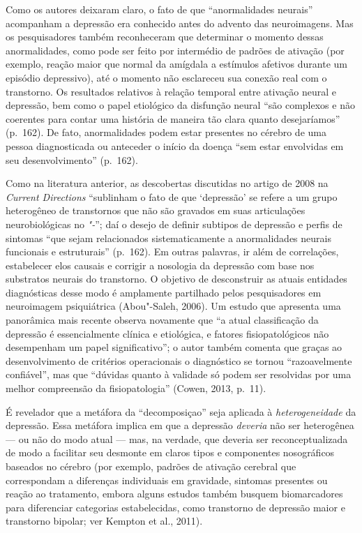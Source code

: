 Como os autores deixaram claro, o fato de que ``anormalidades neurais''
acompanham a depressão era conhecido antes do advento das neuroimagens.
Mas os pesquisadores também reconheceram que determinar o momento dessas
anormalidades, como pode ser feito por intermédio de padrões de ativação
(por exemplo, reação maior que normal da amígdala a estímulos afetivos
durante um episódio depressivo), até o momento não esclareceu sua
conexão real com o transtorno. Os resultados relativos à relação
temporal entre ativação neural e depressão, bem como o papel etiológico
da disfunção neural ``são complexos e não coerentes para contar uma
história de maneira tão clara quanto desejaríamos'' (p.~162). De fato,
anormalidades podem estar presentes no cérebro de uma pessoa
diagnosticada ou anteceder o início da doença ``sem estar envolvidas em
seu desenvolvimento'' (p.~162).

Como na literatura anterior, as descobertas discutidas no artigo de 2008
na \emph{Current Directions} ``sublinham o fato de que `depressão' se
refere a um grupo heterogêneo de transtornos que não são gravados em
suas articulações neurobiológicas no \emph{"-}''; daí o desejo de
definir subtipos de depressão e perfis de sintomas ``que sejam
relacionados sistematicamente a anormalidades neurais funcionais e
estruturais'' (p.~162). Em outras palavras, ir além de correlações,
estabelecer elos causais e corrigir a nosologia da depressão com base
nos substratos neurais do transtorno. O objetivo de desconstruir as
atuais entidades diagnósticas desse modo é amplamente partilhado pelos
pesquisadores em neuroimagem psiquiátrica (Abou"-Saleh, 2006). Um estudo
que apresenta uma panorâmica mais recente observa novamente que ``a
atual classificação da depressão é essencialmente clínica e etiológica,
e fatores fisiopatológicos não desempenham um papel significativo''; o
autor também comenta que graças ao desenvolvimento de critérios
operacionais o diagnóstico se tornou ``razoavelmente confiável'', mas
que ``dúvidas quanto à validade só podem ser resolvidas por uma melhor
compreensão da fisiopatologia'' (Cowen, 2013, p.~11).

É revelador que a metáfora da ``decomposiçao'' seja aplicada à
\emph{heterogeneidade} da depressão. Essa metáfora implica em que a
depressão \emph{deveria} não ser heterogênea --- ou não do modo atual
--- mas, na verdade, que deveria ser reconceptualizada de modo a
facilitar seu desmonte em claros tipos e componentes nosográficos
baseados no cérebro (por exemplo, padrões de ativação cerebral que
correspondam a diferenças individuais em gravidade, sintomas presentes
ou reação ao tratamento, embora alguns estudos também busquem
biomarcadores para diferenciar categorias estabelecidas, como transtorno
de depressão maior e transtorno bipolar; ver Kempton et al., 2011).

